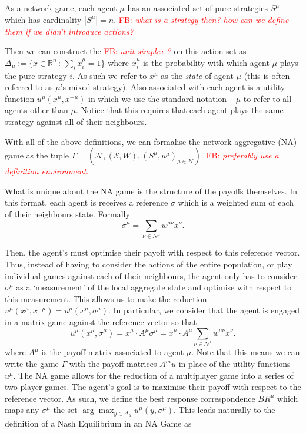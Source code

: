 \documentclass{article}
\theoremstyle{definition}
\newcommand{\fb}[1]{\textcolor{red}{FB: \textit{#1}}}
\newcommand{\agentset}{\mathcal{N}}
\newcommand{\edgeset}{\mathcal{E}}
\newcommand{\weightset}{W}
\newcommand{\actionset}[1]{S^{#1}}
\newcommand{\utility}[1]{u^{#1}}
\newcommand{\wmunu}{w^{\mu \nu}}
\newcommand{\xmu}{x^{\mu}}
\newcommand{\xnu}{x^{\nu}}
\newcommand{\refmu}{\sigma^{\mu}}
\newcommand{\weightedsum}{ \sum_{\nu \in N^\mu} \wmunu \xnu}
\newcommand{\xnotmu}{x^{-\mu}}
\newcommand{\xmuaction}[1]{x^{\mu}_{#1}}
\begin{document}
	As a network game, each agent $\mu$ has an associated set of
        pure strategies $\actionset{\mu}$ which has cardinality
        $|\actionset{\mu}| = n$. \fb{what is a strategy then? how can
          we define them if we didn't introduce actions?}



        Then we can construct the \fb{unit-simplex ?} on this action
        set as $\Delta_\mu := \{x \in \mathbb{R}^n \, : \, \sum_i
        \xmuaction{i} = 1\}$ where $\xmuaction{i}$ is the probability
        with which agent $\mu$ plays the pure strategy $i$. As such we
        refer to $\xmu$ as the \emph{state} of agent $\mu$ (this is
        often referred to as $\mu$'s mixed strategy). Also associated
        with each agent is a utility function $u^\mu(\xmu, \xnotmu)$
        in which we use the standard notation $-\mu$ to refer to all
        agents other than $\mu$. Notice that this requires that each
        agent plays the same strategy against all of their neighbours.

	With all of the above definitions, we can formalise the
        network aggregative (NA) game as the tuple $\Gamma =
        (\agentset, (\edgeset, \weightset), (\actionset{\mu},
        \utility{\mu})_{\mu \in \mathcal{N}})$. \fb{preferably use a
          definition environment.}

	What is unique about the NA game is the structure of the
        payoffs themselves. In this format, each agent is receives a
        reference $\sigma$ which is a weighted sum of each of their
        neighbours state. Formally
%
	\begin{equation}
		\sigma^\mu = \sum_{\nu \in N^\mu} \wmunu \xnu.
	\end{equation}

	Then, the agent's must optimise their payoff with respect to
        this reference vector. Thus, instead of having to consider the
        actions of the entire population, or play individual games
        against each of their neighbours, the agent only has to
        consider $\sigma^\mu$ as a `measurement' of the local
        aggregate state and optimise with respect to this
        measurement. This allows us to make the reduction $u^\mu(\xmu,
        \xnotmu) = u^\mu(\xmu, \refmu)$. In particular, we consider
        that the agent is engaged in a matrix game against the
        reference vector so that
%
	\begin{equation}
		u^\mu(\xmu, \refmu) = \xmu \cdot A^\mu \refmu = \xmu
                \cdot A^\mu \weightedsum.
	\end{equation}
	where $A^\mu$ is the payoff matrix associated to agent
        $\mu$. Note that this means we can write the game
        $\Gamma$ with the payoff matrices $A^mu$ in place of the
        utility functions $\utility{\mu}$. The NA game allows for the
        reduction of a multiplayer game into a series of two-player
        games. The agent's goal is to maximise their payoff with
        respect to the reference vector. As such, we define the best
        response correspondence $BR^\mu$ which maps any $\refmu$ the
        set $\arg \max_{y \in \Delta_\mu} {u^\mu(y, \refmu)}$. This
        leads naturally to the definition of a Nash Equilibrium in an
        NA Game as
\end{document}
